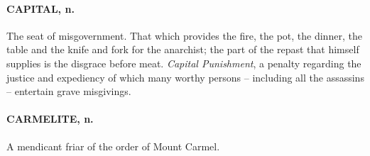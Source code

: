 \documentclass[11pt]{article}
\begin{document}
\paragraph{CAPITAL, n.}  The seat of misgovernment.  That which provides the fire,
the pot, the dinner, the table and the knife and fork for the
anarchist; the part of the repast that himself supplies is the
disgrace before meat.  {\em Capital Punishment}, a penalty regarding the
justice and expediency of which many worthy persons -- including all
the assassins -- entertain grave misgivings.

\paragraph{CARMELITE, n.}  A mendicant friar of the order of Mount Carmel.
\end{document}
